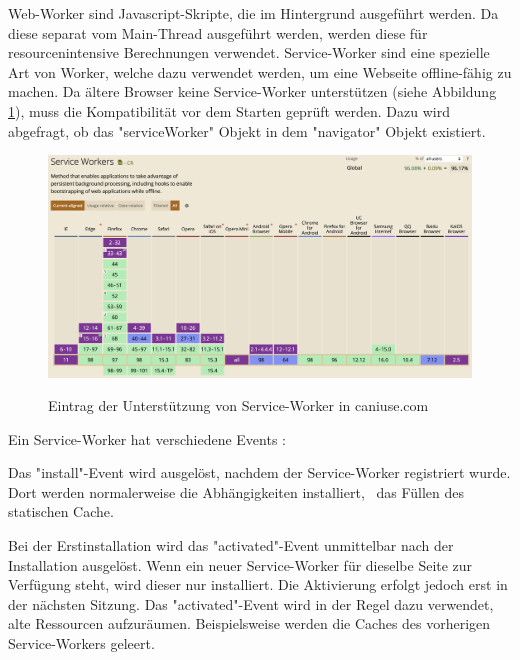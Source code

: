 

Web-Worker sind Javascript-Skripte, die im Hintergrund ausgeführt werden. 
Da diese separat vom Main-Thread ausgeführt werden, werden diese für resourcenintensive Berechnungen verwendet.
Service-Worker sind eine spezielle Art von Worker, welche dazu verwendet werden, um eine Webseite offline-fähig zu machen.
Da ältere Browser keine Service-Worker unterstützen (siehe Abbildung \ref{fig:CanIUseServiceWorker}), muss die Kompatibilität vor dem Starten geprüft werden. 
Dazu wird abgefragt, ob das "serviceWorker" Objekt in dem "navigator" Objekt existiert. 

\begin{figure}[H]
    \centering
    \includegraphics[width=\textwidth]{media/ServiceWorker/CanIUseServiceWorker.png}
    \caption{Eintrag der Unterstützung von Service-Worker in caniuse.com}
    \cite{ciuServiceWorker}
    \label{fig:CanIUseServiceWorker}
\end{figure}

\clearpage


Ein Service-Worker hat verschiedene Events \cite{MDNCacheAPI}: 


Das "{\ttfamily install}"-Event wird ausgelöst, nachdem der Service-Worker registriert wurde. Dort werden normalerweise die Abhängigkeiten installiert, \zb\ das Füllen des statischen Cache.
    

Bei der Erstinstallation wird das "{\ttfamily activated}"-Event unmittelbar nach der Installation ausgelöst.
Wenn ein neuer Service-Worker für dieselbe Seite zur Verfügung steht, wird dieser nur installiert.
Die Aktivierung erfolgt jedoch erst in der nächsten Sitzung.
Das "{\ttfamily activated}"-Event wird in der Regel dazu verwendet, alte Ressourcen aufzuräumen. 
Beispielsweise werden die Caches des vorherigen Service-Workers geleert.

